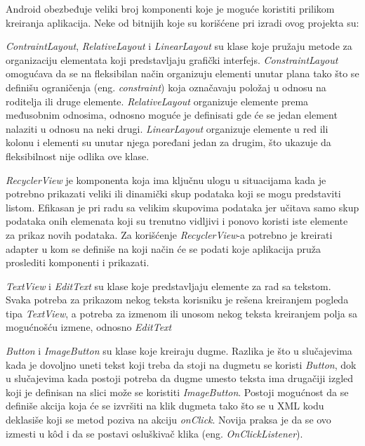 \documentclass[implementacija.tex]{subfiles}
\begin{document}
Android obezbeđuje veliki broj komponenti koje je moguće koristiti prilikom kreiranja aplikacija. Neke od bitnijih koje su korišćene pri izradi ovog projekta su:
\begin{description}
    \item \textit{ContraintLayout}, \textit{RelativeLayout} i \textit{LinearLayout} su klase koje pružaju metode za organizaciju elementata koji predstavljaju grafički interfejs. \textit{ConstraintLayout} omogućava da se na fleksibilan način organizuju elementi unutar plana tako što se definišu ograničenja (eng. \textit{constraint}) koja označavaju položaj u odnosu na roditelja ili druge elemente. \textit{RelativeLayout} organizuje elemente prema međusobnim odnosima, odnosno moguće je definisati gde će se jedan element nalaziti u odnosu na neki drugi. \textit{LinearLayout} organizuje elemente u red ili kolonu i elementi su unutar njega poređani jedan za drugim, što ukazuje da fleksibilnost nije odlika ove klase.
    \item \textit{RecyclerView} je komponenta koja ima ključnu ulogu u situacijama  kada je potrebno prikazati veliki ili dinamički skup podataka koji se mogu predstaviti listom. Efikasan je pri radu sa velikim skupovima podataka jer učitava samo skup podataka onih elemenata koji su trenutno vidljivi i ponovo koristi iste elemente za prikaz novih podataka. Za korišćenje \textit{RecyclerView}-a potrebno je kreirati adapter u kom se definiše na koji način će se podati koje aplikacija pruža proslediti komponenti i prikazati. 
    \item \textit{TextView} i \textit{EditText} su klase koje predstavljaju elemente za rad sa tekstom. Svaka potreba za prikazom nekog teksta korisniku je rešena kreiranjem pogleda tipa \textit{TextView}, a potreba za izmenom ili unosom nekog teksta kreiranjem polja sa mogućnošću izmene, odnosno \textit{EditText}
    \item \textit{Button} i \textit{ImageButton} su klase koje kreiraju dugme. Razlika je što u slučajevima kada je dovoljno uneti tekst koji treba da stoji na dugmetu se koristi \textit{Button}, dok u slučajevima kada postoji potreba da dugme umesto teksta ima drugačiji izgled koji je definisan na slici može se koristiti \textit{ImageButton}. Postoji mogućnost da se definiše akcija koja će se izvršiti na klik dugmeta tako što se u XML kodu deklasiše koji se metod poziva na akciju \textit{onClick}. Novija praksa je da se ovo izmesti u k\^{o}d i da se postavi osluškivač klika (eng. \textit{OnClickListener}).
\end{description}
\end{document}
